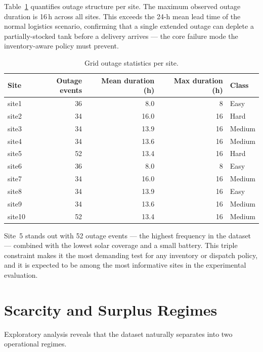 Table~\ref{tab:outage_stats} quantifies outage structure per site.  The
maximum observed outage duration is 16\,h across all sites.  This exceeds the
24-h mean lead time of the normal logistics scenario, confirming that a single
extended outage can deplete a partially-stocked tank before a delivery
arrives --- the core failure mode the inventory-aware policy must prevent.

\begin{table}[htb]
\centering
\small
\caption{Grid outage statistics per site.}
\label{tab:outage_stats}
\begin{tabular}{lrrrl}
\toprule
\textbf{Site} & \textbf{Outage events} & \textbf{Mean duration (h)} &
\textbf{Max duration (h)} & \textbf{Class} \\
\midrule
site1  & 36 &  8.0 &  8 & Easy   \\
site2  & 34 & 16.0 & 16 & Hard   \\
site3  & 34 & 13.9 & 16 & Medium \\
site4  & 34 & 13.6 & 16 & Medium \\
site5  & 52 & 13.4 & 16 & Hard   \\
site6  & 36 &  8.0 &  8 & Easy   \\
site7  & 34 & 16.0 & 16 & Medium \\
site8  & 34 & 13.9 & 16 & Easy   \\
site9  & 34 & 13.6 & 16 & Medium \\
site10 & 52 & 13.4 & 16 & Medium \\
\bottomrule
\end{tabular}
\end{table}

Site~5 stands out with 52 outage events --- the highest frequency in the
dataset --- combined with the lowest solar coverage and a small battery.
This triple constraint makes it the most demanding test for any inventory or
dispatch policy, and it is expected to be among the most informative sites
in the experimental evaluation.


\section{Scarcity and Surplus Regimes}
\label{sec:scarcity_surplus}

Exploratory analysis reveals that the dataset naturally separates into two
operational regimes.

